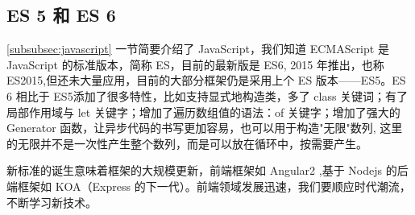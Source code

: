 \documentclass[UTF8]{ctexbook}
\begin{document}
{{        \subsection{ES 5 和 ES 6}
          \label{subsubsec:es_5_和_es_6}
            \ref{subsubsec:javascript} 一节简要介绍了 JavaScript，我们知道 ECMAScript 是 JavaScript 的标准版本，简称 ES，目前的最新版是 ES6, 2015 年推出，也称 ES2015,但还未大量应用，目前的大部分框架仍是采用上个 ES 版本——ES5。ES 6 相比于 ES5添加了很多特性，比如支持显式地构造类，多了 class 关键词；有了局部作用域与 let 关键字；增加了遍历数组值的语法：of 关键字；增加了强大的 Generator 函数，让异步代码的书写更加容易，也可以用于构造"无限"数列, 这里的无限并不是一次性产生整个数列，而是可以放在循环中，按需要产生。
            \par
            新标准的诞生意味着框架的大规模更新，前端框架如 Angular2 ,基于 Nodejs 的后端框架如 KOA（Express 的下一代）。前端领域发展迅速，我们要顺应时代潮流，不断学习新技术。

}}
\end{document}
